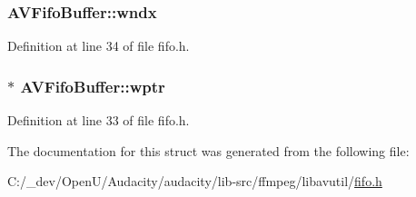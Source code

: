 \subsubsection[{\texorpdfstring{wndx}{wndx}}]{ A\+V\+Fifo\+Buffer\+::wndx}\hypertarget{struct_a_v_fifo_buffer_ac2c3c492ec54ed30f1eb3ec8095f557c}{}\label{struct_a_v_fifo_buffer_ac2c3c492ec54ed30f1eb3ec8095f557c}


Definition at line 34 of file fifo.\+h.

\subsubsection[{\texorpdfstring{wptr}{wptr}}]{ $\ast$ A\+V\+Fifo\+Buffer\+::wptr}\hypertarget{struct_a_v_fifo_buffer_a17c13f1f8557d63a3e031af1fdd80039}{}\label{struct_a_v_fifo_buffer_a17c13f1f8557d63a3e031af1fdd80039}


Definition at line 33 of file fifo.\+h.



The documentation for this struct was generated from the following file\+:\begin{DoxyCompactItemize}
\item 
C\+:/\+\_\+dev/\+Open\+U/\+Audacity/audacity/lib-\/src/ffmpeg/libavutil/\hyperlink{ffmpeg_2libavutil_2fifo_8h}{fifo.\+h}\end{DoxyCompactItemize}

